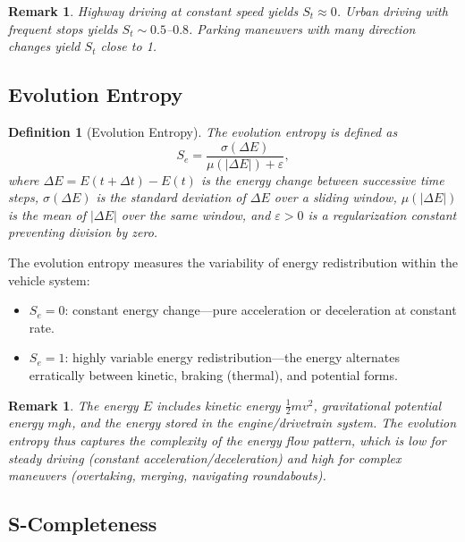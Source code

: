 \documentclass[twocolumn,10pt]{article}
\newtheorem{definition}[theorem]{Definition}
\newtheorem{remark}[theorem]{Remark}
\newcommand{\St}{S_t}
\newcommand{\Se}{S_e}
\begin{document}
\begin{remark}
Highway driving at constant speed yields $\St \approx 0$. Urban driving with frequent stops yields $\St \sim 0.5$--$0.8$. Parking maneuvers with many direction changes yield $\St$ close to 1.
\end{remark}

\subsection{Evolution Entropy}

\begin{definition}[Evolution Entropy]\label{def:Se}
The evolution entropy is defined as
\begin{equation}\label{eq:Se}
\Se = \frac{\sigma(\Delta E)}{\mu(|\Delta E|) + \varepsilon},
\end{equation}
where $\Delta E = E(t + \Delta t) - E(t)$ is the energy change between successive time steps, $\sigma(\Delta E)$ is the standard deviation of $\Delta E$ over a sliding window, $\mu(|\Delta E|)$ is the mean of $|\Delta E|$ over the same window, and $\varepsilon > 0$ is a regularization constant preventing division by zero.
\end{definition}

The evolution entropy measures the variability of energy redistribution within the vehicle system:
\begin{itemize}
    \item $\Se = 0$: constant energy change---pure acceleration or deceleration at constant rate.
    \item $\Se = 1$: highly variable energy redistribution---the energy alternates erratically between kinetic, braking (thermal), and potential forms.
\end{itemize}

\begin{remark}
The energy $E$ includes kinetic energy $\frac{1}{2}mv^2$, gravitational potential energy $mgh$, and the energy stored in the engine/drivetrain system. The evolution entropy thus captures the complexity of the energy flow pattern, which is low for steady driving (constant acceleration/deceleration) and high for complex maneuvers (overtaking, merging, navigating roundabouts).
\end{remark}

\subsection{S-Completeness}
\end{document}
